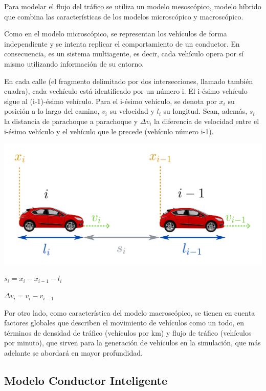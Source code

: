 \documentclass[colorinlistoftodos,twoside,twocolumn]{article} %
\begin{document}
	Para modelar el flujo del tráfico se utiliza un modelo mesosc\'opico, modelo híbrido que combina las características de los modelos microscópico y macroscópico.
	
	Como en el modelo microsc\'opico, se representan los vehículos de forma independiente y se intenta replicar el comportamiento de un conductor. En consecuencia, es un sistema multiagente, es decir, cada vehículo opera por sí mismo utilizando información de su entorno.
	
	En cada calle (el fragmento delimitado por dos intersecciones, llamado tambi\'en cuadra), cada vech\'iculo est\'a identificado por un número i. El i-ésimo vehículo sigue al (i-1)-ésimo vehículo. Para el i-ésimo vehículo, se denota por $ x_{i} $ su posición a lo largo del camino, $ v_{i} $ su velocidad y $ l_{i} $ su longitud. Sean, adem\'as, $ s_{i} $ la distancia de parachoque a parachoque y $ \Delta v_{i} $ la diferencia de velocidad entre el i-ésimo vehículo y el vehículo que le precede (vehículo número i-1).
	
	\begin{center}
		\includegraphics[width=\columnwidth]{microscopic_model.png}
	\end{center}
	
	\begin{center}
		$ s_{i} = x_{i} - x_{i-1} - l_{i} $
	
		$ \Delta v_{i} = v_{i} - v_{i-1} $
	\end{center}
	
	Por otro lado, como caracter\'istica del modelo macrosc\'opico, se tienen en cuenta factores globales que describen el movimiento de vehículos como un todo, en términos de densidad de tráfico (vehículos por km) y flujo de tráfico (vehículos por minuto), que sirven para la generación de vehículos en la simulación, que más adelante se abordará en mayor profundidad.
	
	\subsection{Modelo Conductor Inteligente}
	
\end{document}
